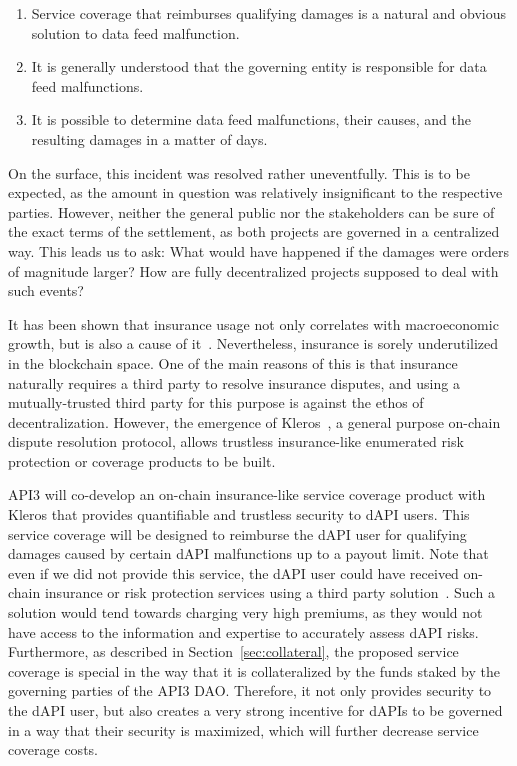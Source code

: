 \documentclass[11pt]{article}
\begin{document}
\begin{enumerate}
    \item Service coverage that reimburses qualifying damages is a natural and obvious solution to data feed malfunction.
    \item It is generally understood that the governing entity is responsible for data feed malfunctions.
    \item It is possible to determine data feed malfunctions, their causes, and the resulting damages in a matter of days.
\end{enumerate}

On the surface, this incident was resolved rather uneventfully.
This is to be expected, as the amount in question was relatively insignificant to the respective parties.
However, neither the general public nor the stakeholders can be sure of the exact terms of the settlement, as both projects are governed in a centralized way.
This leads us to ask: What would have happened if the damages were orders of magnitude larger?
How are fully decentralized projects supposed to deal with such events?

It has been shown that insurance usage not only correlates with macroeconomic growth, but is also a cause of it~\cite{outreville:2013}.
Nevertheless, insurance is sorely underutilized in the blockchain space.
One of the main reasons of this is that insurance naturally requires a third party to resolve insurance disputes, and using a mutually-trusted third party for this purpose is against the ethos of decentralization.
However, the emergence of Kleros~\cite{kleros:2019}, a general purpose on-chain dispute resolution protocol, allows trustless insurance-like enumerated risk protection or coverage products to be built.

API3 will co-develop an on-chain insurance-like service coverage product with Kleros that provides quantifiable and trustless security to dAPI users.
This service coverage will be designed to reimburse the dAPI user for qualifying damages caused by certain dAPI malfunctions up to a payout limit.
Note that even if we did not provide this service, the dAPI user could have received on-chain insurance or risk protection services using a third party solution~\cite{nexus-mutual}.
Such a solution would tend towards charging very high premiums, as they would not have access to the information and expertise to accurately assess dAPI risks.
Furthermore, as described in Section~\ref{sec:collateral}, the proposed service coverage is special in the way that it is collateralized by the funds staked by the governing parties of the API3 DAO.
Therefore, it not only provides security to the dAPI user, but also creates a very strong incentive for dAPIs to be governed in a way that their security is maximized, which will further decrease service coverage costs.
\end{document}
